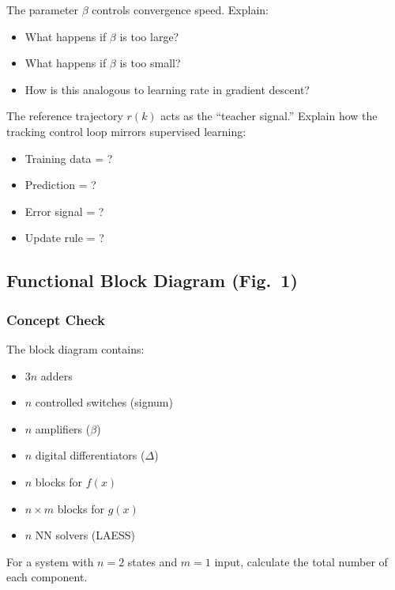 \begin{answerbox}\end{answerbox}

The parameter $\beta$ controls convergence speed. Explain:
\begin{itemize}[nosep]
  \item What happens if $\beta$ is too large?
  \item What happens if $\beta$ is too small?
  \item How is this analogous to learning rate in gradient descent?
\end{itemize}

\begin{answerbox}\end{answerbox}

The reference trajectory $r(k)$ acts as the ``teacher signal.'' Explain how the tracking control loop mirrors supervised learning:
\begin{itemize}[nosep]
  \item Training data = ?
  \item Prediction = ?
  \item Error signal = ?
  \item Update rule = ?
\end{itemize}

\begin{answerbox}\end{answerbox}

\subsection{Functional Block Diagram (Fig.~1)}

\subsubsection*{Concept Check}

The block diagram contains:
\begin{itemize}[nosep]
  \item $3n$ adders
  \item $n$ controlled switches (signum)
  \item $n$ amplifiers ($\beta$)
  \item $n$ digital differentiators ($\Delta$)
  \item $n$ blocks for $f(x)$
  \item $n \times m$ blocks for $g(x)$
  \item $n$ NN solvers (LAESS)
\end{itemize}
For a system with $n=2$ states and $m=1$ input, calculate the total number of each component.

